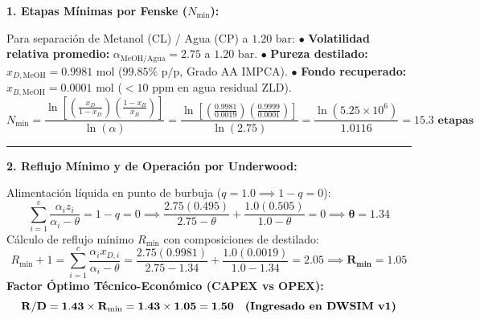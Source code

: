 \documentclass[10pt,landscape]{article}
\begin{document}
\noindent
\begin{minipage}[t]{0.488\textwidth}
  \begin{tcolorbox}[colback=white,colframe=navyblue,arc=1.5mm,boxrule=0.7pt,top=3pt,bottom=3pt,left=6pt,right=6pt,height=0.52\textheight]
    \setlength{\abovedisplayskip}{2pt}
    \setlength{\belowdisplayskip}{2pt}
    \textbf{\fontsize{8.5pt}{10pt}\selectfont \color{navyblue}1. Etapas Mínimas por Fenske ($N_{\min}$):}\par\vspace{1.5pt}
    \scriptsize
    Para separación de Metanol (CL) / Agua (CP) a $1.20\text{ bar}$: \newline
    $\bullet$ \textbf{Volatilidad relativa promedio:} $\alpha_{\text{MeOH/Agua}} = \mathbf{2.75}$ a $1.20\text{ bar}$. \newline
    $\bullet$ \textbf{Pureza destilado:} $x_{D,\text{MeOH}} = 0.9981\text{ mol}$ ($99.85\%\text{ p/p}$, Grado AA IMPCA). \newline
    $\bullet$ \textbf{Fondo recuperado:} $x_{B,\text{MeOH}} = 0.0001\text{ mol}$ ($< 10\text{ ppm}$ en agua residual ZLD). \newline
    \vspace{-2pt}
    \begin{equation*}
      N_{\min} = \frac{\ln\left[\left(\frac{x_{D}}{1 - x_{D}}\right)\left(\frac{1 - x_{B}}{x_{B}}\right)\right]}{\ln(\alpha)} = \frac{\ln\left[\left(\frac{0.9981}{0.0019}\right)\left(\frac{0.9999}{0.0001}\right)\right]}{\ln(2.75)} = \frac{\ln(5.25 \times 10^6)}{1.0116} = \mathbf{15.3\text{ etapas}}
    \end{equation*}
    \vspace{1.5pt}
    \hrule
    \vspace{2.5pt}
    \textbf{\fontsize{8.5pt}{10pt}\selectfont \color{navyblue}2. Reflujo Mínimo y de Operación por Underwood:}\par\vspace{1.5pt}
    Alimentación líquida en punto de burbuja ($q = 1.0 \implies 1 - q = 0$):
    \begin{equation*}
      \sum_{i=1}^c \frac{\alpha_i z_i}{\alpha_i - \theta} = 1 - q = 0 \implies \frac{2.75(0.495)}{2.75 - \theta} + \frac{1.0(0.505)}{1.0 - \theta} = 0 \implies \boldsymbol{\theta = 1.34}
    \end{equation*}
    Cálculo de reflujo mínimo $R_{\min}$ con composiciones de destilado:
    \begin{equation*}
      R_{\min} + 1 = \sum_{i=1}^c \frac{\alpha_i x_{D,i}}{\alpha_i - \theta} = \frac{2.75(0.9981)}{2.75 - 1.34} + \frac{1.0(0.0019)}{1.0 - 1.34} = 2.05 \implies \boldsymbol{R_{\min} = 1.05}
    \end{equation*}
    \textbf{Factor Óptimo Técnico-Económico (CAPEX vs OPEX):}
    \begin{equation*}
      \mathbf{R/D = 1.43 \times R_{\min} = 1.43 \times 1.05 = 1.50 \quad \text{\textbf{(Ingresado en DWSIM v1)}}}
    \end{equation*}
  \end{tcolorbox}
\end{minipage}
\end{document}
